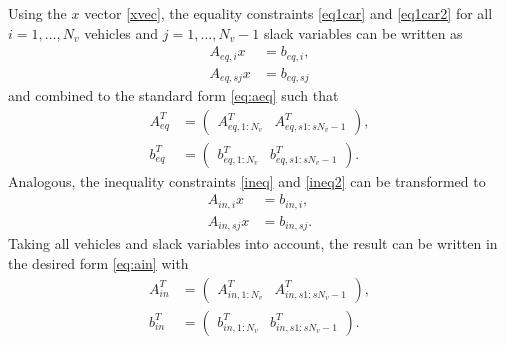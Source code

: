 \documentclass[letterpaper,10pt,conference]{ieeeconf}
\begin{document}
Using the $x$ vector \eqref{xvec}, the equality constraints \eqref{eq1car} and \eqref{eq1car2} for all $i=1,\dots, N_v$ vehicles and $j=1,\dots, N_v-1$ slack variables can be written as
\begin{align}
    A_{eq,i}x&=b_{eq,i}, \\
    A_{eq,sj}x&=b_{eq,sj}
\end{align}
and combined to the standard form \eqref{eq:aeq} such that
\begin{align}
A_{eq}^T&=
\begin{pmatrix}
    A_{eq,1:N_v}^T & A_{eq,s1:sN_v-1}^T
    \end{pmatrix},\\
    b_{eq}^T&=\begin{pmatrix}
    b_{eq,1:N_v}^T & b_{eq,s1:sN_v-1}^T
    \end{pmatrix}.
\end{align}
Analogous, the inequality constraints \eqref{ineq} and \eqref{ineq2} can be transformed to
\begin{align}
    A_{in,i}x&=b_{in,i}, \\
    A_{in,sj}x&=b_{in,sj}.
\end{align}
Taking all vehicles and slack variables into account, the result can be written in the desired form \eqref{eq:ain} with
\begin{align}
A_{in}^T&=
\begin{pmatrix}
    A_{in,1:N_v}^T & A_{in,s1:sN_v-1}^T
    \end{pmatrix},\\
    b_{in}^T&=\begin{pmatrix}
    b_{in,1:N_v}^T & b_{in,s1:sN_v-1}^T
    \end{pmatrix}.
\end{align}
\end{document}
